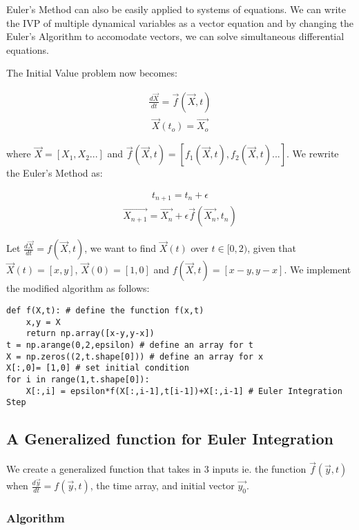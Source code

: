 \documentclass[10pt,letterpaper]{article}
\begin{document}
Euler's Method can also be easily applied to systems of equations. We can write the IVP of multiple dynamical variables as a vector equation and by changing the Euler's Algorithm to accomodate vectors, we can solve simultaneous differential equations.

The Initial Value problem now becomes:

\begin{eqnarray}\frac{d\vec{X}}{dt} = \vec{f}(\vec{X}, t)\end{eqnarray}
\begin{eqnarray}\vec{X}(t_o) = \vec{X_o}\end{eqnarray}

where $\vec{X}=[X_1,X_2...]$ and $\vec{f}(\vec{X}, t)=[f_1(\vec{X}, t),f_2(\vec{X}, t)...]$. We rewrite the Euler's Method as:

\begin{eqnarray}t_{n+1} = t_n + \epsilon \end{eqnarray}
\begin{eqnarray}\vec{X_{n+1}} = \vec{X_n} + \epsilon \vec{f}(\vec{X_n}, t_n)\end{eqnarray}

Let $\frac{d\vec{X}}{dt}=f(\vec{X},t)$, we want to find $\vec{X}(t)$ over $t\in[0,2)$, given that $\vec{X}(t)=[x,y]$, $\vec{X}(0)=[1,0]$ and $f(\vec{X},t) = [x-y,y-x]$. We implement the modified algorithm as follows:

\begin{verbatim}
def f(X,t): # define the function f(x,t)
    x,y = X
    return np.array([x-y,y-x])
t = np.arange(0,2,epsilon) # define an array for t
X = np.zeros((2,t.shape[0])) # define an array for x
X[:,0]= [1,0] # set initial condition
for i in range(1,t.shape[0]):
    X[:,i] = epsilon*f(X[:,i-1],t[i-1])+X[:,i-1] # Euler Integration Step
\end{verbatim}

\subsection*{A Generalized function for Euler Integration}

We create a generalized function that takes in 3 inputs ie. the function $\vec{f}(\vec{y},t)$ when $\frac{d\vec{y}}{dt}=f(\vec{y},t)$, the time array, and initial vector $\vec{y_0}$.

\subsubsection*{Algorithm}
\end{document}
